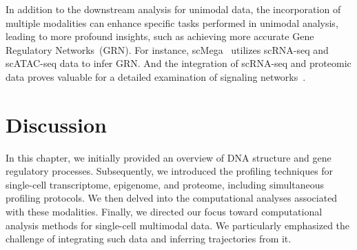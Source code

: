 In addition to the downstream analysis for unimodal data, the incorporation of multiple modalities can enhance specific tasks performed in unimodal analysis, leading to more profound insights, such as achieving more accurate Gene Regulatory Networks~(GRN). For instance, scMega~\citep{li2023scmega} utilizes scRNA-seq and scATAC-seq data to infer GRN. And the integration of scRNA-seq and proteomic data proves valuable for a detailed examination of signaling networks~\citep{heumos2023best}.




\section{Discussion}
\label{background:Discussion}
In this chapter, we initially provided an overview of DNA structure and gene regulatory processes. Subsequently, we introduced the profiling techniques for single-cell transcriptome, epigenome, and proteome, including simultaneous profiling protocols. We then delved into the computational analyses associated with these modalities. Finally, we directed our focus toward computational analysis methods for single-cell multimodal data. We particularly emphasized the challenge of integrating such data and inferring trajectories from it.